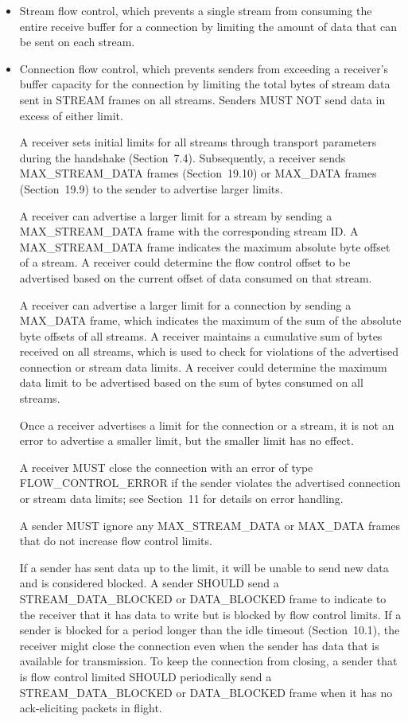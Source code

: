 \documentclass{article}
\begin{document}
\begin{itemize}
\item Stream flow control, which prevents a single stream from consuming the entire receive buffer for a connection by limiting the amount of data that can be sent on each stream.
\item Connection flow control, which prevents senders from exceeding a receiver's buffer capacity for the connection by limiting the total bytes of stream data sent in STREAM frames on all streams.
Senders MUST NOT send data in excess of either limit.

A receiver sets initial limits for all streams through transport parameters during the handshake (Section~7.4).  Subsequently, a receiver sends MAX\_STREAM\_DATA frames (Section~19.10) or MAX\_DATA frames (Section~19.9) to the sender to advertise larger limits.

A receiver can advertise a larger limit for a stream by sending a MAX\_STREAM\_DATA frame with the corresponding stream ID.  A MAX\_STREAM\_DATA frame indicates the maximum absolute byte offset of a stream.  A receiver could determine the flow control offset to be advertised based on the current offset of data consumed on that stream.

A receiver can advertise a larger limit for a connection by sending a MAX\_DATA frame, which indicates the maximum of the sum of the absolute byte offsets of all streams.  A receiver maintains a cumulative sum of bytes received on all streams, which is used to check for violations of the advertised connection or stream data limits.  A receiver could determine the maximum data limit to be advertised based on the sum of bytes consumed on all streams.

Once a receiver advertises a limit for the connection or a stream, it is not an error to advertise a smaller limit, but the smaller limit has no effect.

A receiver MUST close the connection with an error of type FLOW\_CONTROL\_ERROR if the sender violates the advertised connection or stream data limits; see Section~11 for details on error handling.

A sender MUST ignore any MAX\_STREAM\_DATA or MAX\_DATA frames that do not increase flow control limits.

If a sender has sent data up to the limit, it will be unable to send new data and is considered blocked.  A sender SHOULD send a STREAM\_DATA\_BLOCKED or DATA\_BLOCKED frame to indicate to the receiver that it has data to write but is blocked by flow control limits.  If a sender is blocked for a period longer than the idle timeout (Section~10.1), the receiver might close the connection even when the sender has data that is available for transmission.  To keep the connection from closing, a sender that is flow control limited SHOULD periodically send a STREAM\_DATA\_BLOCKED or DATA\_BLOCKED frame when it has no ack-eliciting packets in flight.

\end{itemize}
\end{document}
